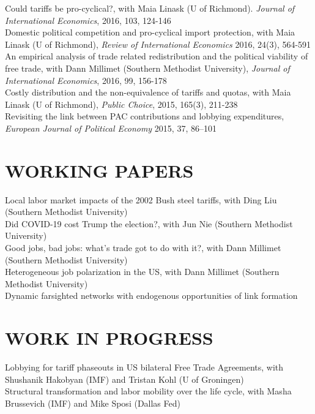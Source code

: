 \documentclass[11pt]{res}
\begin{document}
\begin{resume}
{Could tariffs be pro-cyclical?}, with Maia Linask (U of Richmond). \emph{Journal of International Economics}, 2016, 103, 124-146 \vspace{1.5mm}\\
{Domestic political competition and pro-cyclical import protection}, with Maia Linask (U of Richmond), \emph{Review of International Economics} 2016, 24(3), 564-591\vspace{1.5mm}\\
{An empirical analysis of trade related redistribution and the political viability of free trade}, with Dann Millimet (Southern Methodist University), \emph{Journal of International Economics}, 2016, 99, 156-178 \vspace{1.5mm}\\
{Costly distribution and the non-equivalence of tariffs and quotas}, with Maia Linask (U of Richmond), \emph{Public Choice}, 2015, 165(3), 211-238 \vspace{1.5mm}\\
{Revisiting the link between PAC contributions and lobbying expenditures, \emph{European Journal of Political Economy}} 2015, 37, 86--101

\section{WORKING PAPERS}\vspace{1.5mm}
Local labor market impacts of the 2002 Bush steel tariffs, with Ding Liu (Southern Methodist University)\vspace{1.5mm}\\
{Did COVID-19 cost Trump the election?}, with Jun Nie (Southern Methodist University)\vspace{1.5mm}\\
{Good jobs, bad jobs: what's trade got to do with it?}, with Dann Millimet (Southern Methodist University)\vspace{1.5mm}\\
{Heterogeneous job polarization in the US}, with Dann Millimet (Southern Methodist University)\vspace{1.5mm}\\
{Dynamic farsighted networks with endogenous opportunities of link formation}

\section{WORK IN PROGRESS}\vspace{1.5mm}
Lobbying for tariff phaseouts in US bilateral Free Trade Agreements, with Shushanik Hakobyan (IMF) and Tristan Kohl (U of Groningen)\vspace{1.5mm}\\
Structural transformation and labor mobility over the life cycle, with Masha Brussevich (IMF) and Mike Sposi (Dallas Fed)



\end{resume}
\end{document}
